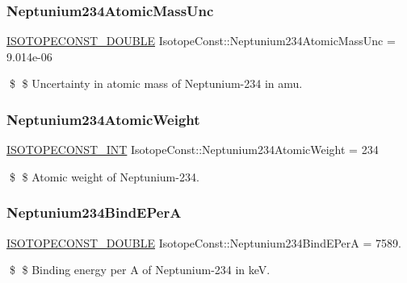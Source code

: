 \subsubsection{\texorpdfstring{Neptunium234\+Atomic\+Mass\+Unc}{Neptunium234AtomicMassUnc}}
{\footnotesize\ttfamily \mbox{\hyperlink{group___isotope_const-_macros_ga8f45a7272ce02c0b4c65c44636ed719a}{I\+S\+O\+T\+O\+P\+E\+C\+O\+N\+S\+T\+\_\+\+D\+O\+U\+B\+LE}} Isotope\+Const\+::\+Neptunium234\+Atomic\+Mass\+Unc = 9.\+014e-\/06}

\$ \$ Uncertainty in atomic mass of Neptunium-\/234 in amu. \mbox{\label{group___isotope_const-_neptunium-_np234_ga932ef4fea18b27cb38a6100c2eb1e7f4}} 
\subsubsection{\texorpdfstring{Neptunium234\+Atomic\+Weight}{Neptunium234AtomicWeight}}
{\footnotesize\ttfamily \mbox{\hyperlink{group___isotope_const-_macros_ga5f18360b3e99483a35c32d789e62621c}{I\+S\+O\+T\+O\+P\+E\+C\+O\+N\+S\+T\+\_\+\+I\+NT}} Isotope\+Const\+::\+Neptunium234\+Atomic\+Weight = 234}

\$ \$ Atomic weight of Neptunium-\/234. \mbox{\label{group___isotope_const-_neptunium-_np234_ga2d89107b7a609b536a7c6aae13d24550}} 
\subsubsection{\texorpdfstring{Neptunium234\+Bind\+E\+PerA}{Neptunium234BindEPerA}}
{\footnotesize\ttfamily \mbox{\hyperlink{group___isotope_const-_macros_ga8f45a7272ce02c0b4c65c44636ed719a}{I\+S\+O\+T\+O\+P\+E\+C\+O\+N\+S\+T\+\_\+\+D\+O\+U\+B\+LE}} Isotope\+Const\+::\+Neptunium234\+Bind\+E\+PerA = 7589.}

\$ \$ Binding energy per A of Neptunium-\/234 in keV. \mbox{\label{group___isotope_const-_neptunium-_np234_ga559be452af24a61f5ea6a5af686e0b0c}} 
